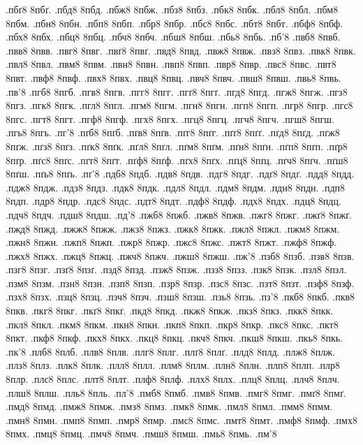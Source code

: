 {.пбґ8
8пбґ.
.пбд8
8пбд.
.пбж8
8пбж.
.пбз8
8пбз.
.пбк8
8пбк.
.пбл8
8пбл.
.пбм8
8пбм.
.пбн8
8пбн.
.пбп8
8пбп.
.пбр8
8пбр.
.пбс8
8пбс.
.пбт8
8пбт.
.пбф8
8пбф.
.пбх8
8пбх.
.пбц8
8пбц.
.пбч8
8пбч.
.пбш8
8пбш.
.пбь8
8пбь.
.пб'8
.пвб8
8пвб.
.пвв8
8пвв.
.пвг8
8пвг.
.пвґ8
8пвґ.
.пвд8
8пвд.
.пвж8
8пвж.
.пвз8
8пвз.
.пвк8
8пвк.
.пвл8
8пвл.
.пвм8
8пвм.
.пвн8
8пвн.
.пвп8
8пвп.
.пвр8
8пвр.
.пвс8
8пвс.
.пвт8
8пвт.
.пвф8
8пвф.
.пвх8
8пвх.
.пвц8
8пвц.
.пвч8
8пвч.
.пвш8
8пвш.
.пвь8
8пвь.
.пв'8
.пгб8
8пгб.
.пгв8
8пгв.
.пгг8
8пгг.
.пгґ8
8пгґ.
.пгд8
8пгд.
.пгж8
8пгж.
.пгз8
8пгз.
.пгк8
8пгк.
.пгл8
8пгл.
.пгм8
8пгм.
.пгн8
8пгн.
.пгп8
8пгп.
.пгр8
8пгр.
.пгс8
8пгс.
.пгт8
8пгт.
.пгф8
8пгф.
.пгх8
8пгх.
.пгц8
8пгц.
.пгч8
8пгч.
.пгш8
8пгш.
.пгь8
8пгь.
.пг'8
.пґб8
8пґб.
.пґв8
8пґв.
.пґг8
8пґг.
.пґґ8
8пґґ.
.пґд8
8пґд.
.пґж8
8пґж.
.пґз8
8пґз.
.пґк8
8пґк.
.пґл8
8пґл.
.пґм8
8пґм.
.пґн8
8пґн.
.пґп8
8пґп.
.пґр8
8пґр.
.пґс8
8пґс.
.пґт8
8пґт.
.пґф8
8пґф.
.пґх8
8пґх.
.пґц8
8пґц.
.пґч8
8пґч.
.пґш8
8пґш.
.пґь8
8пґь.
.пґ'8
.пдб8
8пдб.
.пдв8
8пдв.
.пдг8
8пдг.
.пдґ8
8пдґ.
.пдд8
8пдд.
.пдж8
8пдж.
.пдз8
8пдз.
.пдк8
8пдк.
.пдл8
8пдл.
.пдм8
8пдм.
.пдн8
8пдн.
.пдп8
8пдп.
.пдр8
8пдр.
.пдс8
8пдс.
.пдт8
8пдт.
.пдф8
8пдф.
.пдх8
8пдх.
.пдц8
8пдц.
.пдч8
8пдч.
.пдш8
8пдш.
.пд'8
.пжб8
8пжб.
.пжв8
8пжв.
.пжг8
8пжг.
.пжґ8
8пжґ.
.пжд8
8пжд.
.пжж8
8пжж.
.пжз8
8пжз.
.пжк8
8пжк.
.пжл8
8пжл.
.пжм8
8пжм.
.пжн8
8пжн.
.пжп8
8пжп.
.пжр8
8пжр.
.пжс8
8пжс.
.пжт8
8пжт.
.пжф8
8пжф.
.пжх8
8пжх.
.пжц8
8пжц.
.пжч8
8пжч.
.пжш8
8пжш.
.пж'8
.пзб8
8пзб.
.пзв8
8пзв.
.пзг8
8пзг.
.пзґ8
8пзґ.
.пзд8
8пзд.
.пзж8
8пзж.
.пзз8
8пзз.
.пзк8
8пзк.
.пзл8
8пзл.
.пзм8
8пзм.
.пзн8
8пзн.
.пзп8
8пзп.
.пзр8
8пзр.
.пзс8
8пзс.
.пзт8
8пзт.
.пзф8
8пзф.
.пзх8
8пзх.
.пзц8
8пзц.
.пзч8
8пзч.
.пзш8
8пзш.
.пзь8
8пзь.
.пз'8
.пкб8
8пкб.
.пкв8
8пкв.
.пкг8
8пкг.
.пкґ8
8пкґ.
.пкд8
8пкд.
.пкж8
8пкж.
.пкз8
8пкз.
.пкк8
8пкк.
.пкл8
8пкл.
.пкм8
8пкм.
.пкн8
8пкн.
.пкп8
8пкп.
.пкр8
8пкр.
.пкс8
8пкс.
.пкт8
8пкт.
.пкф8
8пкф.
.пкх8
8пкх.
.пкц8
8пкц.
.пкч8
8пкч.
.пкш8
8пкш.
.пкь8
8пкь.
.пк'8
.плб8
8плб.
.плв8
8плв.
.плг8
8плг.
.плґ8
8плґ.
.плд8
8плд.
.плж8
8плж.
.плз8
8плз.
.плк8
8плк.
.плл8
8плл.
.плм8
8плм.
.плн8
8плн.
.плп8
8плп.
.плр8
8плр.
.плс8
8плс.
.плт8
8плт.
.плф8
8плф.
.плх8
8плх.
.плц8
8плц.
.плч8
8плч.
.плш8
8плш.
.пль8
8пль.
.пл'8
.пмб8
8пмб.
.пмв8
8пмв.
.пмг8
8пмг.
.пмґ8
8пмґ.
.пмд8
8пмд.
.пмж8
8пмж.
.пмз8
8пмз.
.пмк8
8пмк.
.пмл8
8пмл.
.пмм8
8пмм.
.пмн8
8пмн.
.пмп8
8пмп.
.пмр8
8пмр.
.пмс8
8пмс.
.пмт8
8пмт.
.пмф8
8пмф.
.пмх8
8пмх.
.пмц8
8пмц.
.пмч8
8пмч.
.пмш8
8пмш.
.пмь8
8пмь.
.пм'8
}
